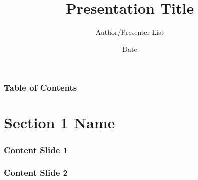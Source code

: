 \documentclass[11pt]{beamer}
\title{Presentation Title}
\date{Date}
\author{Author/Presenter List}
\begin{document}
\begin{frame}[plain]
	\titlepage
\end{frame}

\begin{frame}
	\frametitle{Table of Contents}
\end{frame}


\section{Section 1 Name}

\begin{frame}
	\frametitle{Content Slide 1}
\end{frame}

\begin{frame}
	\frametitle{Content Slide 2}
\end{frame}
 
\end{document}

